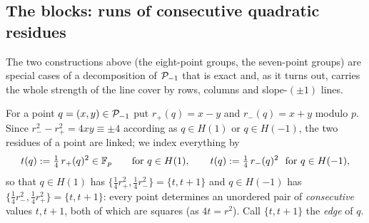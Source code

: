 \subsection*{The blocks: runs of consecutive quadratic residues}\label{sec:blocks}

The two constructions above (the eight-point groups, the seven-point groups) are special cases of a decomposition of $\mathcal{P}_{-1}$ that
is exact and, as it turns out, carries the whole strength of the line cover by rows, columns and slope-$(\pm1)$ lines.

For a point $q=(x,y)\in\mathcal{P}_{-1}$ put $r_+(q)=x-y$ and $r_-(q)=x+y$ modulo $p$.  Since $r_-^2-r_+^2=4xy\equiv\pm4$ according as
$q\in H(1)$ or $q\in H(-1)$, the two residues of a point are linked; we index everything by
\[
 t(q):=\tfrac14\,r_+(q)^2\in\mathbb{F}_p\qquad\text{for }q\in H(1),\qquad t(q):=\tfrac14\,r_-(q)^2\ \ \text{for }q\in H(-1),
\]
so that $q\in H(1)$ has $\{\tfrac14r_+^2,\tfrac14r_-^2\}=\{t,t+1\}$ and $q\in H(-1)$ has $\{\tfrac14r_-^2,\tfrac14r_+^2\}=\{t,t+1\}$:
every point determines an unordered pair of \emph{consecutive} values $t,t+1$, both of which are squares (as $4t=r^2$).  Call
$\{t,t+1\}$ the \emph{edge} of $q$.

